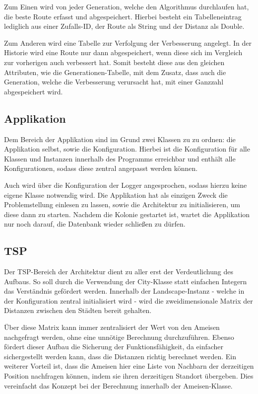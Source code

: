 Zum Einen wird von jeder Generation, welche den Algorithmus durchlaufen hat, die beste Route erfasst und abgespeichert. Hierbei besteht ein Tabelleneintrag lediglich aus einer Zufalls-ID, der Route als String und der Distanz als Double. 

Zum Anderen wird eine Tabelle zur Verfolgung der Verbesserung angelegt. In der Historie wird eine Route nur dann abgespeichert, wenn diese sich im Vergleich zur vorherigen auch verbessert hat. Somit besteht diese aus den gleichen Attributen, wie die Generationen-Tabelle, mit dem Zusatz, dass auch die Generation, welche die Verbesserung verursacht hat, mit einer Ganzzahl abgespeichert wird.

\subsection{Applikation}
Dem Bereich der Applikation sind im Grund zwei Klassen zu zu ordnen: die Applikation selbst, sowie die Konfiguration. Hierbei ist die Konfiguration für alle Klassen und Instanzen innerhalb des Programms erreichbar und enthält alle Konfigurationen, sodass diese zentral angepasst werden können. 

Auch wird über die Konfiguration der Logger angesprochen, sodass hierzu keine eigene Klasse notwendig wird. Die Applikation hat als einzigen Zweck die Problemstellung einlesen zu lassen, sowie die Architektur zu initialisieren, um diese dann zu starten. Nachdem die Kolonie gestartet ist, wartet die Applikation nur noch darauf, die Datenbank wieder schließen zu dürfen.

\subsection{TSP}
Der \ac{TSP}-Bereich der Architektur dient zu aller erst der Verdeutlichung des Aufbaus. So soll durch die Verwendung der City-Klasse statt einfachen Integern das Verständnis gefördert werden. Innerhalb der Landscape-Instanz - welche in der Konfiguration zentral initialisiert wird -  wird die zweidimensionale Matrix der Distanzen zwischen den Städten bereit gehalten. 

Über diese Matrix kann immer zentralisiert der Wert von den Ameisen nachgefragt werden, ohne eine unnötige Berechnung durchzuführen. Ebenso fördert dieser Aufbau die Sicherung der Funktionsfähigkeit, da einfacher sichergestellt werden kann, dass die Distanzen richtig berechnet werden. Ein weiterer Vorteil ist, dass die Ameisen hier eine Liste von Nachbarn der derzeitigen Position nachfragen können, indem sie ihren derzeitigen Standort übergeben. Dies vereinfacht das Konzept bei der Berechnung innerhalb der Ameisen-Klasse.

